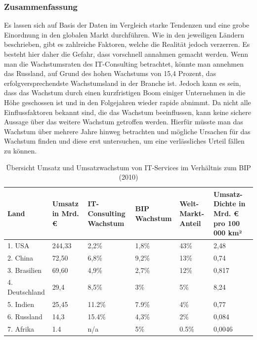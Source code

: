 \subsubsection* {Zusammenfassung}

Es lassen sich auf Basis der Daten im Vergleich starke Tendenzen und eine grobe Einordnung in den globalen Markt durchführen. Wie in den jeweiligen Ländern beschrieben, gibt es zahlreiche Faktoren, welche die Realität jedoch verzerren. Es besteht hier daher die Gefahr, dass vorschnell annahmen gemacht werden. Wenn man die Wachstumsraten des IT-Consulting betrachtet, könnte man annehmen das Russland, auf Grund des hohen Wachstums von 15,4 Prozent, das erfolgversprechendste Wachstumsland in der Branche ist. Jedoch kann es sein, dass das Wachstum durch einen kurzfristigen Boom einiger Unternehmen in die Höhe geschossen ist und in den Folgejahren wieder rapide abnimmt. Da nicht alle Einflussfaktoren bekannt sind, die das Wachstum beeinflussen, kann keine sichere Aussage über das weitere Wachstum getroffen werden. Hierfür müsste man das Wachstum über mehrere Jahre hinweg betrachten und mögliche Ursachen für das Wachstum finden und diese erst untersuchen, um eine verlässliches Urteil fällen zu können.

\begin{table}
\caption{Übersicht Umsatz und Umsatzwachstum von IT-Services im Verhältnis zum BIP  (2010)}
\begin{tabular}{|p{2.6cm}|p{1.5cm}|p{2cm}|p{1.5cm}|p{1.5cm}|p{1.7cm}|}
 \hline
  \textbf{Land} & \textbf{Umsatz in Mrd. €} & \textbf{IT-Consulting Wachstum} & \textbf{BIP Wachstum} & \textbf{Welt-Markt-Anteil} & \textbf{Umsatz-Dichte in Mrd. € pro 100 000 km²} \\
  \hline
    
    1. USA  & 244,33  &2,2\%  & 1,8\% & 43\% & 2,48  \\
    2. China & 72,50 & 6,8\%  & 9,2\% & 13\% & 0,74 \\
    3. Brasilien & 69,60 & 4,9\%  & 2,7\% & 12\% & 0,817 \\
    4. Deutschland & 29,4 & 8,5\%  & 3\% & 5\% & 8,24 \\
    5. Indien & 25,45  & 11.2\%  & 7.9\% & 4\% & 0,77  \\
    6. Russland & 14,3  & 15.4\%  & 4,3\% & 2\% & 0,084  \\
    7. Afrika & 1.4  & n/a  & 5\% & 0.5\% & 0,0046 \\
 \hline
\end{tabular}
\label{table:umsaetze} 
\end{table}


